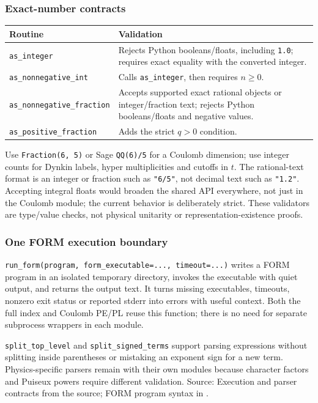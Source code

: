 \documentclass[11pt,a4paper]{article}
\numberwithin{equation}{section}
\newcommand{\code}[1]{{\small\nolinkurl{#1}}}
\newcommand{\src}[1]{{\small\color{muted}Source: #1.}\par}
\begin{document}
\subsubsection{Exact-number contracts}
\begin{tabularx}{\textwidth}{@{}Yp{69mm}@{}}
\toprule Routine & Validation\\\midrule
\code{as_integer} & Rejects Python booleans/floats, including \code{1.0}; requires
exact equality with the converted integer.\\
\code{as_nonnegative_int} & Calls \code{as_integer}, then requires $n\geq0$.\\
\code{as_nonnegative_fraction} & Accepts supported exact rational objects or
integer/fraction text; rejects Python booleans/floats and negative values.\\
\code{as_positive_fraction} & Adds the strict $q>0$ condition.\\\bottomrule
\end{tabularx}
Use \code{Fraction(6, 5)} or Sage \code{QQ(6)/5} for a Coulomb dimension;
use integer counts for Dynkin labels, hyper multiplicities and cutoffs in $t$.
The rational-text format is an integer or fraction such as \code{"6/5"}, not
decimal text such as \code{"1.2"}. Accepting integral floats would broaden the
shared API everywhere, not just in the Coulomb module; the current behavior is
deliberately strict. These validators are type/value checks, not physical
unitarity or representation-existence proofs.

\subsubsection{One FORM execution boundary}
\code{run_form(program, form_executable=..., timeout=...)} writes a FORM program
in an isolated temporary directory, invokes the executable with quiet output,
and returns the output text. It turns missing executables, timeouts, nonzero
exit status or reported stderr into errors with useful context. Both the full
index and Coulomb PE/PL reuse this function; there is no need for separate
subprocess wrappers in each module.

\code{split_top_level} and \code{split_signed_terms} support parsing expressions
without splitting inside parentheses or mistaking an exponent sign for a new
term. Physics-specific parsers remain with their own modules because character
factors and Puiseux powers require different validation.
\src{Execution and parser contracts from the source; FORM program syntax
in \cite{form5}}
\end{document}
